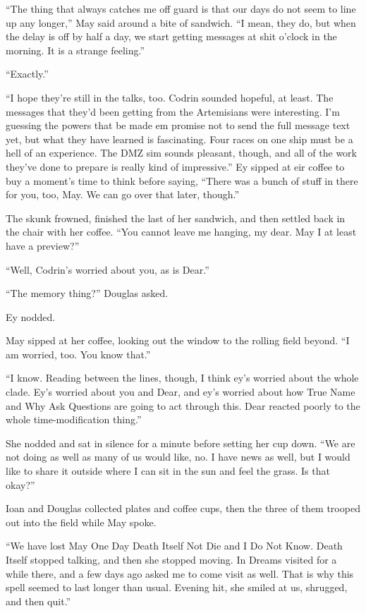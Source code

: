 ``The thing that always catches me off guard is that our days do not seem to line up any longer,'' May said around a bite of sandwich. ``I mean, they do, but when the delay is off by half a day, we start getting messages at shit o'clock in the morning. It is a strange feeling.''

``Exactly.''

``I hope they're still in the talks, too. Codrin sounded hopeful, at least. The messages that they'd been getting from the Artemisians were interesting. I'm guessing the powers that be made em promise not to send the full message text yet, but what they have learned is fascinating. Four races on one ship must be a hell of an experience. The DMZ sim sounds pleasant, though, and all of the work they've done to prepare is really kind of impressive.'' Ey sipped at eir coffee to buy a moment's time to think before saying, ``There was a bunch of stuff in there for you, too, May. We can go over that later, though.''

The skunk frowned, finished the last of her sandwich, and then settled back in the chair with her coffee. ``You cannot leave me hanging, my dear. May I at least have a preview?''

``Well, Codrin's worried about you, as is Dear.''

``The memory thing?'' Douglas asked.

Ey nodded.

May sipped at her coffee, looking out the window to the rolling field beyond. ``I am worried, too. You know that.''

``I know. Reading between the lines, though, I think ey's worried about the whole clade. Ey's worried about you and Dear, and ey's worried about how True Name and Why Ask Questions are going to act through this. Dear reacted poorly to the whole time-modification thing.''

She nodded and sat in silence for a minute before setting her cup down. ``We are not doing as well as many of us would like, no. I have news as well, but I would like to share it outside where I can sit in the sun and feel the grass. Is that okay?''

Ioan and Douglas collected plates and coffee cups, then the three of them trooped out into the field while May spoke.

``We have lost May One Day Death Itself Not Die and I Do Not Know. Death Itself stopped talking, and then she stopped moving. In Dreams visited for a while there, and a few days ago asked me to come visit as well. That is why this spell seemed to last longer than usual. Evening hit, she smiled at us, shrugged, and then quit.''

